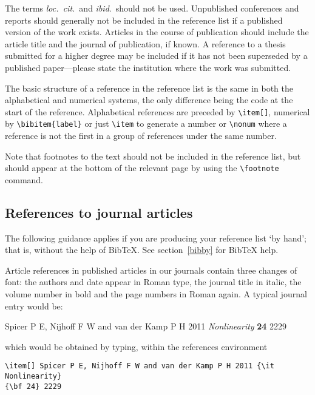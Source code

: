 \documentclass[12pt]{iopart}
\begin{document}
The terms {\it loc.\ cit.}\ and {\it ibid}.\ should not be used. 
Unpublished conferences and reports should generally not be included 
in the reference list if a published version of the work exists. Articles in the course of publication should 
include the article title and the journal of publication, if known. 
A reference to a thesis submitted for a higher degree may be included 
if it has not been superseded by a published 
paper---please state the institution where the work was submitted.

The basic structure of a reference in the reference list is the same in both the alphabetical and numerical systems, the only difference being the code at the start of the reference. Alphabetical references are preceded by \verb"\item[]", numerical by \verb"\bibitem{label}" or just \verb"\item" to generate a number or \verb"\nonum" where a reference is not the first in a group of references under the same number.

Note that footnotes to the text should not be 
included in the reference list, but should appear at the bottom of the relevant page by using the \verb"\footnote" command.
   
\subsection{References to journal articles}
The following guidance applies if you are producing your reference list `by hand'; that is,
without the help of BibTeX.  See section~\ref{bibby} for BibTeX help.

Article references in published articles in our journals contain three changes of 
font:
the authors and date appear in Roman type, the journal title in 
italic, the volume number in bold and the page numbers in Roman again. 
A typical journal entry would be:

\smallskip
\begin{harvard}
\item[] Spicer P E, Nijhoff F W and van der Kamp P H 2011 {\it Nonlinearity} {\bf 24} 2229
\end{harvard}
\smallskip

\noindent which would be obtained by typing, within the references
environment 
\small\begin{verbatim}
\item[] Spicer P E, Nijhoff F W and van der Kamp P H 2011 {\it Nonlinearity} 
{\bf 24} 2229
\end{verbatim}\normalsize
\end{document}

